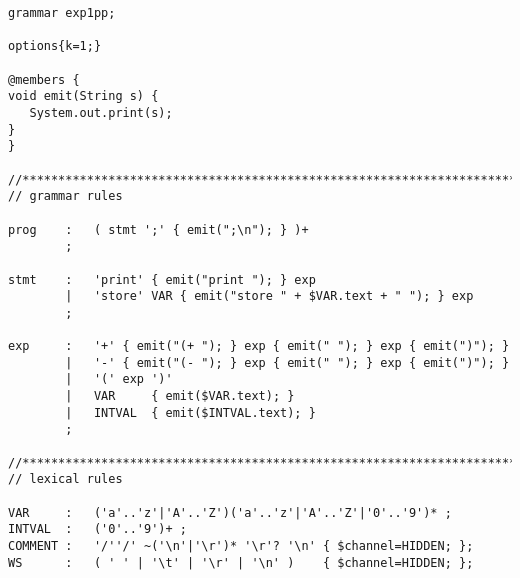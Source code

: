 \begin{minipage}{4.8in}
\begin{lstlisting}[frame=single,language=antlr]
grammar exp1pp;

options{k=1;}

@members {
void emit(String s) {
   System.out.print(s);
}
}

//**********************************************************************
// grammar rules

prog 	:	( stmt ';' { emit(";\n"); } )+ 
		;

stmt	:	'print' { emit("print "); } exp
		|	'store' VAR { emit("store " + $VAR.text + " "); } exp
		;

exp	   	:   '+' { emit("(+ "); } exp { emit(" "); } exp { emit(")"); }
   		|   '-' { emit("(- "); } exp { emit(" "); } exp { emit(")"); }
		|	'(' exp ')'
		|	VAR 	{ emit($VAR.text); }
		|	INTVAL 	{ emit($INTVAL.text); }
		;
	
//**********************************************************************
// lexical rules

VAR		:	('a'..'z'|'A'..'Z')('a'..'z'|'A'..'Z'|'0'..'9')* ;
INTVAL	:	('0'..'9')+ ;
COMMENT :   '/''/' ~('\n'|'\r')* '\r'? '\n'	{ $channel=HIDDEN; };
WS  	:   ( ' ' | '\t' | '\r' | '\n' ) 	{ $channel=HIDDEN; };
\end{lstlisting}
\end{minipage}